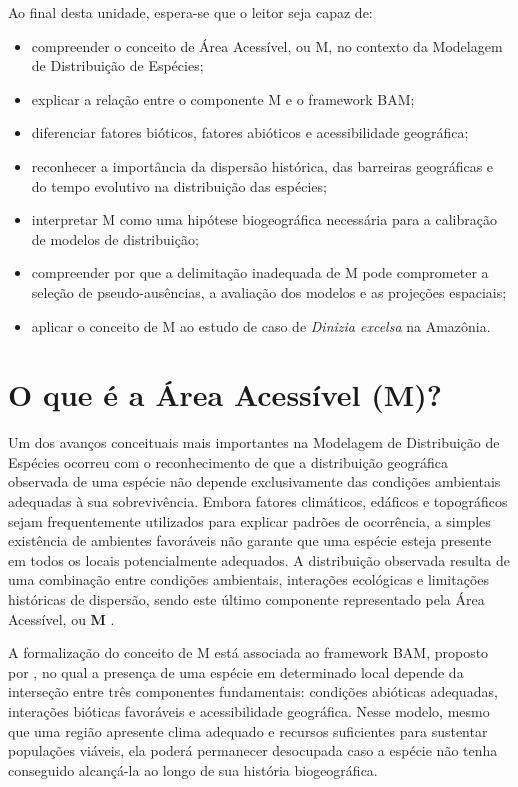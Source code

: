 \begin{objetivos}
	Ao final desta unidade, espera-se que o leitor seja capaz de:
	
	\begin{itemize}
		\item compreender o conceito de Área Acessível, ou M, no contexto da Modelagem de Distribuição de Espécies;
		\item explicar a relação entre o componente M e o framework BAM;
		\item diferenciar fatores bióticos, fatores abióticos e acessibilidade geográfica;
		\item reconhecer a importância da dispersão histórica, das barreiras geográficas e do tempo evolutivo na distribuição das espécies;
		\item interpretar M como uma hipótese biogeográfica necessária para a calibração de modelos de distribuição;
		\item compreender por que a delimitação inadequada de M pode comprometer a seleção de pseudo-ausências, a avaliação dos modelos e as projeções espaciais;
		\item aplicar o conceito de M ao estudo de caso de \textit{Dinizia excelsa} na Amazônia.
	\end{itemize}
\end{objetivos}

\section{O que é a Área Acessível (M)?}

Um dos avanços conceituais mais importantes na Modelagem de Distribuição de Espécies ocorreu com o reconhecimento de que a distribuição geográfica observada de uma espécie não depende exclusivamente das condições ambientais adequadas à sua sobrevivência. Embora fatores climáticos, edáficos e topográficos sejam frequentemente utilizados para explicar padrões de ocorrência, a simples existência de ambientes favoráveis não garante que uma espécie esteja presente em todos os locais potencialmente adequados. A distribuição observada resulta de uma combinação entre condições ambientais, interações ecológicas e limitações históricas de dispersão, sendo este último componente representado pela Área Acessível, ou \textbf{M} \parencite{Soberon2007,Peterson2011}.

A formalização do conceito de M está associada ao framework BAM, proposto por \textcite{Soberon2007}, no qual a presença de uma espécie em determinado local depende da interseção entre três componentes fundamentais: condições abióticas adequadas, interações bióticas favoráveis e acessibilidade geográfica. Nesse modelo, mesmo que uma região apresente clima adequado e recursos suficientes para sustentar populações viáveis, ela poderá permanecer desocupada caso a espécie não tenha conseguido alcançá-la ao longo de sua história biogeográfica.

